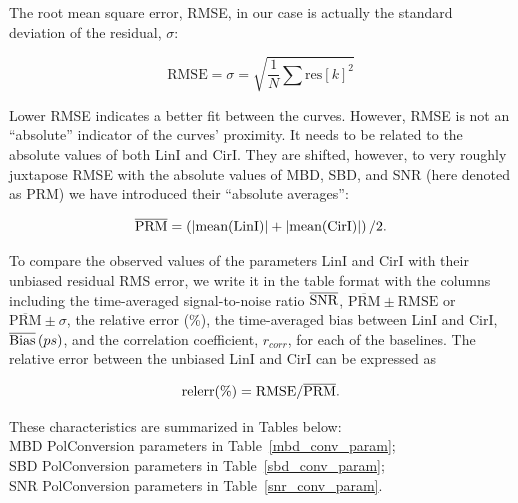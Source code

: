 \documentclass[letterpaper,twoside,12pt]{article}
\begin{document}
The root mean square error, RMSE, in our case is actually the standard deviation of the residual, $\sigma$:

\begin{equation}
  \label{rmse}
  \mathrm{RMSE} = \sigma = \sqrt{\frac{1}{N} \sum \mathrm{res}[k]^2}
\end{equation}

Lower RMSE indicates a better fit between the curves. However, RMSE is not an ``absolute'' indicator of the curves' proximity. It needs to be related to the absolute values of both $\mathrm{LinI}$ and $\mathrm{CirI}$. They are shifted, however, to very roughly juxtapose RMSE with the absolute values of MBD, SBD, and SNR (here denoted as PRM) we have introduced their ``absolute averages'':

\begin{equation}
  \label{abs_avg}
  \overline{\mathrm{PRM}} = \left( \rm |mean(LinI)| + |mean(CirI)| \right)/2.
\end{equation}

To compare the observed values of the parameters LinI and CirI with their unbiased residual RMS error, we write it in the table format with the columns including the time-averaged signal-to-noise ratio $\overline{\rm{SNR}}$, $\overline{\mathrm{PRM}} \pm \mathrm{RMSE}$ or $\overline{\mathrm{PRM}} \pm \sigma$, the relative error (\%), the time-averaged bias between LinI and CirI, $\overline{\rm{Bias}}\, (ps)$, and the correlation coefficient, $r_{corr}$, for each of the baselines. The relative error between the unbiased LinI and CirI can be expressed as

\begin{equation}
  \label{rel_err}
  \rm relerr (\%) = RMSE / \overline{\mathrm{PRM}}.
\end{equation}

These characteristics are summarized in Tables below: \\

\noindent MBD PolConversion parameters in Table~\ref{mbd_conv_param}; \\
\noindent SBD PolConversion parameters in Table~\ref{sbd_conv_param}; \\
\noindent SNR PolConversion parameters in Table~\ref{snr_conv_param}. \\
\end{document}
